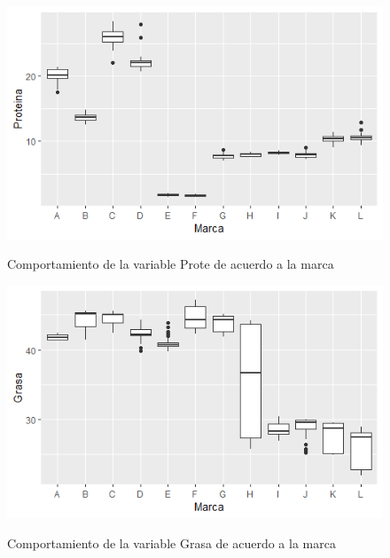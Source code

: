 \documentclass[pdf]{beamer}
\begin{document}
\begin{frame}
\begin{figure}[h]
\centering
\includegraphics[scale=.65]{images/prote.png} 
\label{i4}
\caption{Comportamiento de la variable Prote de acuerdo a la marca}
\end{figure}
\end{frame}


\begin{frame}
\begin{figure}[h]
\centering
\includegraphics[scale=.65]{images/grasa.png} 
\label{i5}
\caption{Comportamiento de la variable Grasa de acuerdo a la marca}
\end{figure}
\end{frame}
\end{document}
